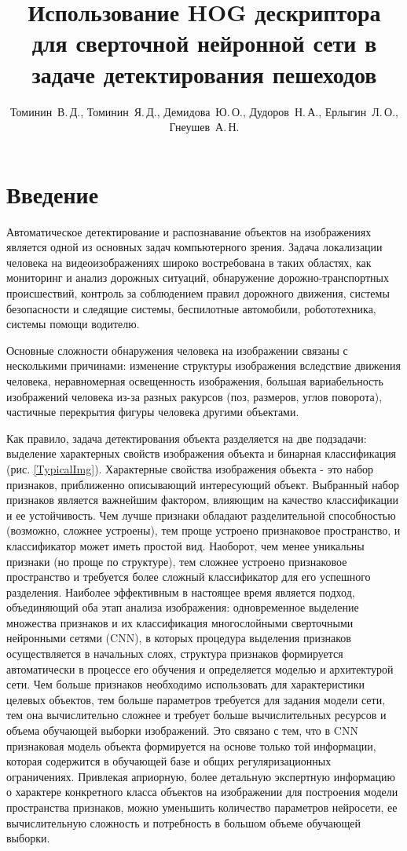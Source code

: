 \documentclass[12pt,twoside]{article}
\title
    [HOG дескриптор для сверточной нейронной сети в задаче детектирования пешеходов] %
	{Использование HOG дескриптора для сверточной нейронной сети в задаче детектирования пешеходов}
\author
    [Томинин~В.\,Д., Томинин~Я.\,Д., Демидова~Ю.\,О., Дудоров~Н.\,А., Ерлыгин~Л.\,О.] %
    {Томинин~В.\,Д., Томинин~Я.\,Д., Демидова~Ю.\,О., Дудоров~Н.\,А., Ерлыгин~Л.\,О., Гнеушев~А.\,Н.} %
    [Томинин$^1$~В.\,Д., Томинин$^1$~Я.\,Д., Демидова$^1$~Ю.\,О., Дудоров$^1$~Н.\,А., Ерлыгин$^1$~Л.\,О., Гнеушев$^{1,2}$~А.\,Н.] %
\begin{document}
\maketitle
\section{Введение}
Автоматическое детектирование и распознавание объектов на изображениях является одной из основных задач компьютерного зрения. 
Задача локализации человека на видеоизображениях широко востребована в таких областях, как мониторинг и анализ дорожных ситуаций, обнаружение дорожно-транспортных происшествий, контроль за соблюдением правил дорожного движения, системы безопасности и следящие системы, беспилотные автомобили, робототехника, системы помощи водителю.

Основные сложности обнаружения человека на изображении связаны с несколькими причинами: изменение структуры изображения вследствие движения человека, неравномерная освещенность изображения, большая вариабельность изображений человека из-за разных ракурсов (поз, размеров, углов поворота), частичные перекрытия фигуры человека другими объектами.

Как правило, задача детектирования объекта разделяется на две подзадачи: выделение характерных свойств изображения объекта и бинарная классификация (рис. \ref{TypicalImg}). Характерные свойства изображения объекта - это набор признаков, приближенно описывающий интересующий объект. Выбранный набор признаков является важнейшим фактором, влияющим на качество классификации и ее устойчивость. Чем лучше признаки обладают разделительной способностью (возможно, сложнее устроены), тем проще устроено признаковое пространство, и классификатор может иметь простой вид. Наоборот, чем менее уникальны признаки (но проще по структуре), тем сложнее устроено признаковое пространство и требуется более сложный классификатор для его успешного разделения. Наиболее эффективным в настоящее время является подход, объединяющий оба этап анализа изображения: одновременное выделение множества  признаков и их классификация многослойными сверточными нейронными сетями (CNN), в которых процедура выделения признаков осуществляется в начальных слоях, структура признаков формируется автоматически в процессе его обучения и определяется моделью и архитектурой сети. Чем больше признаков необходимо использовать для характеристики целевых объектов, тем больше параметров требуется для задания модели сети, тем она вычислительно сложнее и требует больше вычислительных ресурсов и объема обучающей выборки изображений. Это связано с тем, что в CNN признаковая модель объекта формируется на основе только той информации, которая содержится в обучающей базе и общих регуляризационных ограничениях. Привлекая априорную, более детальную экспертную информацию о характере конкретного класса объектов на изображении для построения модели пространства признаков, можно уменьшить количество параметров нейросети, ее вычислительную сложность и потребность в большом  объеме обучающей выборки.
\end{document}

